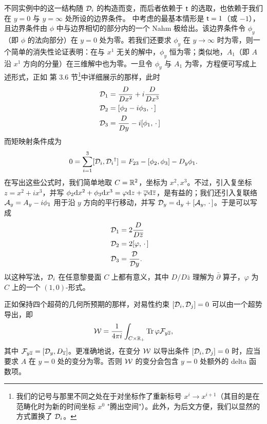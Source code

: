 不同实例中的这一结构随 ${\mathcal D}_i$ 的构造而变，而后者依赖于 ${ \sf t}$ 的选取，也依赖于我们在 $y=0$ 与 $y=\infty$ 处所设的边界条件。\cite{fiveknots} 中考虑的最基本情形是 ${ \sf t}=1$（或 $-1$），且边界条件由 $\phi$ 中与边界相切的部分内的一个 Nahm 极给出。该边界条件令 $\phi_y$（即 $\phi$ 的法向部分）在 $y=0$ 处为零。若我们还要求 $\phi_y$ 在 $y\to\infty$ 时为零，则一个简单的消失性论证表明：在与 $x^1$ 无关的解中，$\phi_y$ 恒为零；类似地，$A_1$（即 $A$ 沿 $x^1$ 方向的分量）在三维解中也为零。一旦令 $\phi_y$ 与 $A_1$ 为零，方程便可写成上述形式，正如 \cite{fiveknots} 第 3.6 节\footnote{我们的记号与那里不同之处在于对坐标作了重新标号 $x^i\to x^{i+1}$（其目的是在范畴化时为新的时间坐标 $x^0$ "腾出空间"）。此外，为后文方便，我们以显然的方式置换了 ${\mathcal D}_i$。}中详细展示的那样，此时
\begin{align}\label{eqform} {\mathcal D}_1 & = \frac{D}{Dx^2}+i\frac{D}{Dx^3}    \cr
                                   {\mathcal D}_2 & = [\phi_2-i\phi_3,\,\cdot\,] \cr
                             {\mathcal D}_3 & = \frac{D}{Dy}-i[\phi_1,\,\cdot\,]  \end{align}
而矩映射条件成为
\begin{equation}\label{mmtmap}0=
\sum_{i=1}^3[{\mathcal D}_i,{\mathcal D}_i{}^\dagger]=F_{23}-[\phi_2,\phi_3]-D_y\phi_1.\end{equation}
 在写出这些公式时，我们简单地取 $C={\mathbb R}^2$，坐标为 $x^2,x^3$。不过，引入复坐标 $z=x^2+ix^3$，并写 $\phi_2{\mathrm d} x^2+\phi_3{\mathrm d} x^3=\varphi {\mathrm d} z+\overline\varphi {\mathrm d}\overline z$，是有益的；我们还引入复联络 ${\mathcal A}_y=A_y-i\phi_1$ 用于沿 $y$ 方向的平行移动，并写 ${\mathcal D}_y={\mathrm d}_y+[{\mathcal A}_y,\,\cdot\,]$。于是可以写成
\begin{align}\label{neqform} {\mathcal D}_1 & =2\frac{D}{D\overline z} \cr
                                                              {\mathcal D}_2 & = 2[\varphi,\,\cdot\,]\cr
                                                               {\mathcal D}_3& = \frac{{\mathcal D}}{{\mathcal D} y}. \end{align}
以这种写法，${\mathcal D}_i$ 在任意黎曼面 $C$ 上都有意义，其中 $D/D\bar z$ 理解为 $\bar\partial $ 算子，$\varphi$ 为 $C$ 上的一个 $(1,0)$-形式。

正如保持四个超荷的几何所预期的那样，对易性约束 $[{\mathcal D}_i,{\mathcal D}_j]=0$ 可以由一个超势导出，即
\begin{equation}\label{superone}{\mathcal W}= \frac{1}{4\pi i}\int_{C\times {\mathbb R}_+}{\mathrm {Tr}}\,\varphi {\mathcal F}_{y\overline z},\end{equation}
其中 ${\mathcal F}_{y\overline z}=[{\mathcal D}_y,D_{\overline z}]$。更准确地说，在变分 ${\mathcal W}$ 以导出条件 $[{\mathcal D}_i,{\mathcal D}_j]=0$ 时，应当要求 $A$ 在 $y=0$ 处的变分为零。否则 ${\mathcal W}$ 的变分会包含 $y=0$ 处额外的 delta 函数项。

